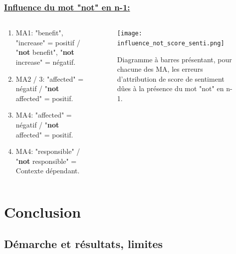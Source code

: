 \documentclass[xcolor=dvipsnames]{beamer}
\begin{document}
	\begin{frame}
		\frametitle{\underline{Influence du mot "not" en n-1:}}
		\begin{columns}
			\begin{column}{0.6\textwidth} %
				\begin{enumerate}
					\item MA1: "benefit", "increase" = positif / "\textbf{not} benefit", "\textbf{not} increase" = négatif.
					\item MA2 / 3: "affected" = négatif / "\textbf{not} affected" = positif.
					\item MA4: "affected" = négatif / "\textbf{not} affected" = positif.
					\item MA4: "responsible" / "\textbf{not} responsible" = Contexte dépendant.
				\end{enumerate}
			\end{column}
			\begin{column}{0.4\textwidth}
					\begin{figure}[htb] %
						\begin{center} %
							\texttt{[image: influence\_not\_score\_senti.png]}
							\caption{Diagramme à barres présentant, pour chacune des MA, les erreurs d'attribution de score de sentiment dûes à la présence du mot "not" en n-1.}\label{not}
						\end{center}
					\end{figure}
			\end{column}
		\end{columns}
	\end{frame}

	\section*{Conclusion}
	\subsection*{Démarche et résultats, limites}
\end{document}
